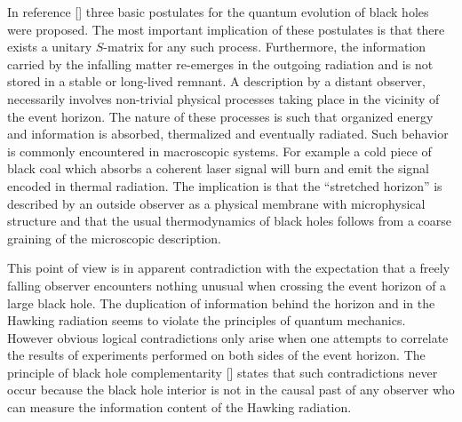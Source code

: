 In reference [\stu] three basic postulates for the quantum evolution
of black holes were proposed.  The most important implication of
these postulates is that there exists a unitary $S$-matrix for any
such process.  Furthermore, the information carried by the infalling
matter re-emerges in the outgoing radiation and is not stored in a
stable or long-lived remnant.  A description by a distant observer,
necessarily involves non-trivial physical processes taking place in
the vicinity of the event horizon.  The nature of these processes is
such that organized energy and information is absorbed, thermalized
and eventually radiated.  Such behavior is commonly encountered in
macroscopic systems.  For example a cold piece of black coal which
absorbs a coherent laser signal will burn and emit the signal encoded
in thermal radiation.  The implication is that the ``stretched
horizon'' is described by an outside observer as a physical membrane
with microphysical structure and that the usual thermodynamics of
black holes follows from a coarse graining of the microscopic
description.

This point of view is in apparent contradiction with the expectation
that a freely falling observer encounters nothing unusual when
crossing the event horizon of a large black hole.  The duplication of
information behind the horizon and in the Hawking radiation seems to
violate the principles of quantum mechanics.  However obvious logical
contradictions only arise when one attempts to correlate the results
of experiments performed on both sides of the event horizon.  The
principle of black hole complementarity [\stu] states that such
contradictions never occur because the black hole interior is not in
the causal past of any observer who can measure the information
content of the Hawking radiation.

